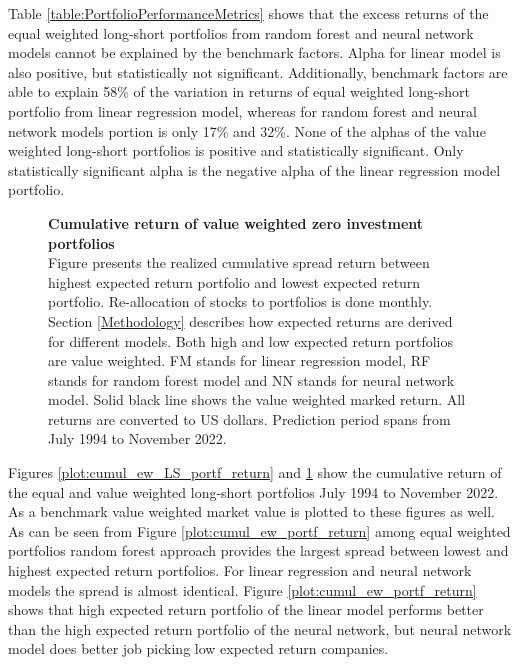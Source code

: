 \documentclass{article}
\begin{document}
Table \ref{table:PortfolioPerformanceMetrics} shows that the excess returns of the equal weighted long-short portfolios from random forest and neural network models cannot be explained by the benchmark factors. Alpha for linear model is also positive, but statistically not significant. Additionally, benchmark factors are able to explain 58\% of the variation in returns of equal weighted long-short portfolio from linear regression model, whereas for random forest and neural network models portion is only 17\% and 32\%. None of the alphas of the value weighted long-short portfolios is positive and statistically significant. Only statistically significant alpha is the negative alpha of the linear regression model portfolio. \par

\begin{figure}[ht]
\centering
\caption[Cumulative return of value weighted zero investment portfolios]{\textbf{Cumulative return of value weighted zero investment portfolios}\\ Figure presents the realized cumulative spread return between highest expected return portfolio and lowest expected return portfolio. Re-allocation of stocks to portfolios is done monthly. Section \ref{Methodology} describes how expected returns are derived for different models. Both high and low expected return portfolios are value weighted. FM stands for linear regression model, RF stands for random forest model and NN stands for neural network model. Solid black line shows the value weighted marked return. All returns are converted to US dollars. Prediction period spans from July 1994 to November 2022.}

\label{plot:cumul_vw_LS_portf_return}
\end{figure}

Figures \ref{plot:cumul_ew_LS_portf_return} and \ref{plot:cumul_vw_LS_portf_return} show the cumulative return of the equal and value weighted long-short portfolios July 1994 to November 2022. As a benchmark value weighted market value is plotted to these figures as well. As can be seen from Figure \ref{plot:cumul_ew_portf_return} among equal weighted portfolios random forest approach provides the largest spread between lowest and highest expected return portfolios. For linear regression and neural network models the spread is almost identical. Figure \ref{plot:cumul_ew_portf_return} shows that high expected return portfolio of the linear model performs better than the high expected return portfolio of the neural network, but neural network model does better job picking low expected return companies. \par
\end{document}
